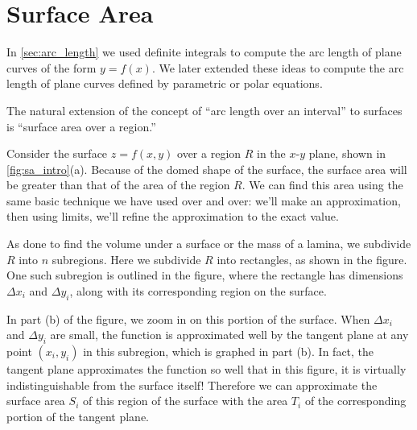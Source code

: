 \section{Surface Area}\label{sec:surface_area}

In \autoref{sec:arc_length} we used definite integrals to compute the arc length of plane curves of the form $y=f(x)$. We later extended these ideas to compute the arc length of plane curves defined by parametric or polar equations. 

The natural extension of the concept of ``arc length over an interval'' to surfaces is ``surface area over a region.'' 

Consider the surface $z=f(x,y)$ over a region $R$ in the $x$-$y$ plane, shown in \autoref{fig:sa_intro}(a). Because of the domed shape of the surface, the surface area will be greater than that of the area of the region $R$. We can find this area using the same basic technique we have used over and over: we'll make an approximation, then using limits, we'll refine the approximation to the exact value.

As done to find the volume under a surface or the mass of a lamina, we subdivide $R$ into $n$ subregions. Here we subdivide $R$ into rectangles, as shown in the figure. One such subregion is outlined in the figure, where the rectangle has dimensions $\Delta x_i$ and $\Delta y_i$, along with its corresponding region on the surface.

In part (b) of the figure, we zoom in on this portion of the surface. When $\Delta x_i$ and $\Delta y_i$ are small, the function is approximated well by the tangent plane at any point $(x_i,y_i)$ in this subregion, which is graphed in part (b). In fact, the tangent plane approximates the function so well that in this figure, it is virtually indistinguishable from the surface itself! Therefore we can approximate the surface area $S_i$ of this region of the surface with the area $T_i$ of the corresponding portion of the tangent plane.

